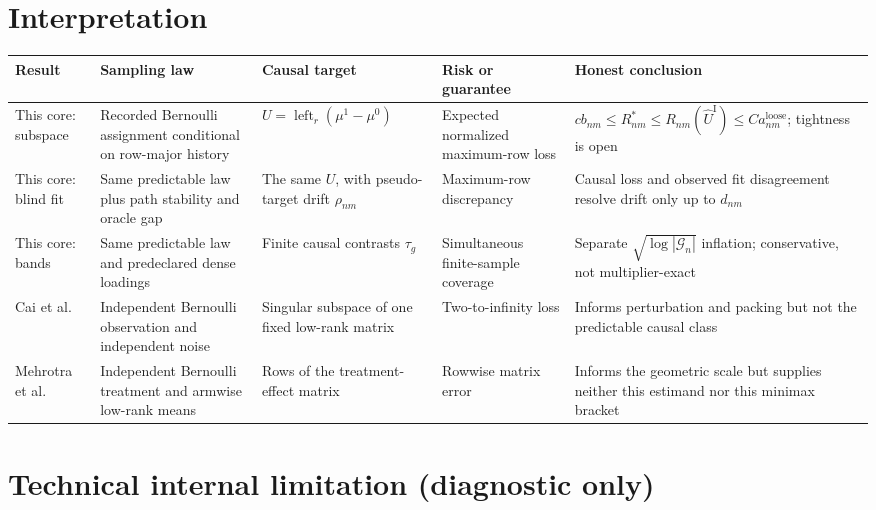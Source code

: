 \documentclass{article}
\begin{document}
\section{Interpretation}

\begin{center}\small\begin{tabular}{p{}p{}p{}p{}p{}}\hline Result & Sampling law & Causal target & Risk or guarantee & Honest conclusion \\ \hline This core: subspace & Recorded Bernoulli assignment conditional on row-major history & \(U=\operatorname{left}_r(\mu^1-\mu^0)\) & Expected normalized maximum-row loss & \(c b_{nm}\le R^*_{nm}\le R_{nm}(\widehat U^{\mathrm I})\le C a^{\mathrm{loose}}_{nm}\); tightness is open \\ This core: blind fit & Same predictable law plus path stability and oracle gap & The same \(U\), with pseudo-target drift \(\rho_{nm}\) & Maximum-row discrepancy & Causal loss and observed fit disagreement resolve drift only up to \(d_{nm}\) \\ This core: bands & Same predictable law and predeclared dense loadings & Finite causal contrasts \(\tau_g\) & Simultaneous finite-sample coverage & Separate \(\sqrt{\log|\mathcal G_n|}\) inflation; conservative, not multiplier-exact \\ Cai et al. & Independent Bernoulli observation and independent noise & Singular subspace of one fixed low-rank matrix & Two-to-infinity loss & Informs perturbation and packing but not the predictable causal class \\ Mehrotra et al. & Independent Bernoulli treatment and armwise low-rank means & Rows of the treatment-effect matrix & Rowwise matrix error & Informs the geometric scale but supplies neither this estimand nor this minimax bracket \\ \hline\end{tabular}\end{center}

\section*{Technical internal limitation (diagnostic only)}
\end{document}
